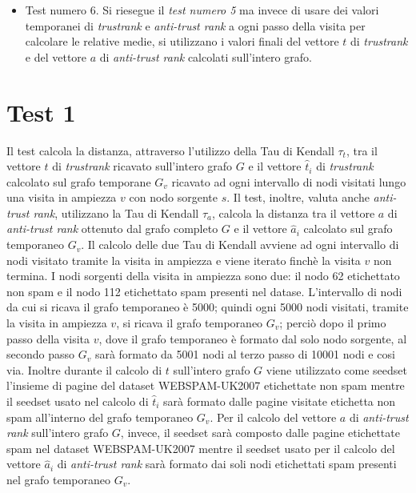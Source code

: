 \begin{itemize}
 \item Test numero 6. Si riesegue il \textit{test numero 5} ma invece di usare dei valori temporanei di \textit{trustrank} e \textit{anti-trust rank} a ogni passo della visita per calcolare le relative medie, si utilizzano i valori finali del vettore \(t\) di \textit{trustrank} e del vettore  \(a\) di \textit{anti-trust rank} calcolati sull'intero grafo.
 \end{itemize}
 
\section{Test 1}
 Il test calcola la distanza, attraverso l'utilizzo  della Tau di Kendall \(\tau_t\), tra il vettore \(t\) di \textit{trustrank} ricavato sull'intero grafo \(G\) e il vettore \(\hat{t}_i\) di \textit{trustrank} calcolato sul grafo temporane \(G_v\) ricavato ad ogni intervallo di nodi visitati lungo una visita in ampiezza \(v\) con nodo sorgente \(s\). Il test, inoltre, valuta anche \textit{anti-trust rank}, utilizzano  la Tau di Kendall \(\tau_a\), calcola la distanza  tra il vettore \(a\) di \textit{anti-trust rank} ottenuto dal grafo completo \(G\) e il vettore \(\hat{a}_i\)  calcolato sul grafo temporaneo \(G_v\). Il calcolo delle due Tau di Kendall avviene ad ogni intervallo di nodi visitato tramite la visita in ampiezza e viene iterato finchè la visita \(v\) non termina.
 I nodi sorgenti della visita in ampiezza sono due: il nodo 62 etichettato non spam e il nodo 112 etichettato spam presenti nel datase. L'intervallo di nodi da cui si ricava il grafo temporaneo è 5000; quindi ogni 5000 nodi visitati, tramite la visita in ampiezza \(v\), si ricava il grafo temporaneo \(G_v\); perciò dopo il primo passo della visita \(v\), dove il grafo temporaneo è formato dal solo nodo sorgente, al secondo passo \(G_v\) sarà formato da 5001 nodi al terzo passo di 10001 nodi e cosi via. Inoltre durante il calcolo di \(t\) sull'intero grafo \(G\) viene utilizzato come seedset l'insieme di pagine del dataset WEBSPAM-UK2007 etichettate  non spam mentre il seedset usato nel calcolo di \(\hat{t}_i\)  sarà formato dalle pagine visitate etichetta non spam all'interno del grafo temporaneo \(G_v\). Per il calcolo del vettore \(a\) di \textit{anti-trust rank} sull'intero grafo \(G\), invece, il seedset sarà composto dalle pagine etichettate spam nel dataset WEBSPAM-UK2007 mentre il seedset usato per il 
calcolo del vettore \(\hat{a}_i\) di \textit{anti-trust rank} sarà formato dai soli nodi  etichettati spam presenti nel grafo temporaneo \(G_v\).

